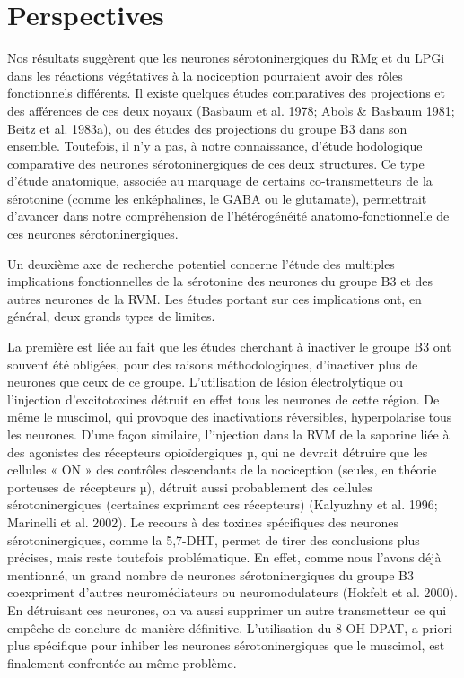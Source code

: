 \documentclass[a4paper,12pt,twoside]{report}
\begin{document}
\section{Perspectives}

Nos résultats suggèrent que les neurones sérotoninergiques du RMg et du LPGi dans les réactions végétatives à la nociception pourraient avoir des rôles fonctionnels différents. Il existe quelques études comparatives des projections et des afférences de ces deux noyaux (Basbaum et al. 1978; Abols \& Basbaum 1981; Beitz et al. 1983a), ou des études des projections du groupe B3 dans son ensemble. Toutefois, il n’y a pas, à notre connaissance, d’étude hodologique comparative des neurones sérotoninergiques de ces deux structures. Ce type d’étude anatomique, associée au marquage de certains co-transmetteurs de la sérotonine (comme les enképhalines, le GABA ou le glutamate), permettrait d’avancer dans notre compréhension de l’hétérogénéité anatomo-fonctionnelle de ces neurones sérotoninergiques.

\bigskip 

Un deuxième axe de recherche potentiel concerne l’étude des multiples implications fonctionnelles de la sérotonine des neurones du groupe B3 et des autres neurones de la RVM. Les études portant sur ces implications ont, en général, deux grands types de limites. 

La première est liée au fait que les études cherchant à inactiver le groupe B3 ont souvent été obligées, pour des raisons méthodologiques, d’inactiver plus de neurones que ceux de ce groupe. L’utilisation de lésion électrolytique ou l’injection d’excitotoxines détruit en effet tous les neurones de cette région. De même le muscimol, qui provoque des inactivations réversibles, hyperpolarise tous les neurones. D’une façon similaire, l’injection dans la RVM de la saporine liée à des agonistes des récepteurs opioïdergiques µ, qui ne devrait détruire que les cellules « ON » des contrôles descendants de la nociception (seules, en théorie porteuses de récepteurs µ), détruit aussi probablement des cellules sérotoninergiques (certaines exprimant ces récepteurs) (Kalyuzhny et al. 1996; Marinelli et al. 2002). Le recours à des toxines spécifiques des neurones sérotoninergiques, comme la 5,7-DHT, permet de tirer des conclusions plus précises, mais reste toutefois problématique. En effet, comme nous l’avons déjà mentionné, un grand nombre de neurones sérotoninergiques du groupe B3 coexpriment d’autres neuromédiateurs ou neuromodulateurs (Hokfelt et al. 2000). En détruisant ces neurones, on va aussi supprimer un autre transmetteur ce qui empêche de conclure de manière définitive. L’utilisation du 8-OH-DPAT, a priori plus spécifique pour inhiber les neurones sérotoninergiques que le muscimol, est finalement confrontée au même problème.
\end{document}
